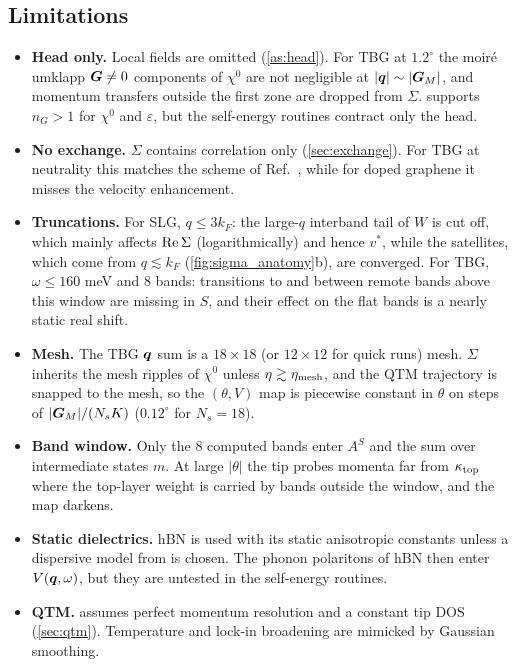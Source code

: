 \subsection{Limitations}

\begin{itemize}[leftmargin=*]
\item \textbf{Head only.} Local fields are omitted (\cref{as:head}). For TBG at $1.2^\circ$ the moir\'e umklapp
$\bm G\neq0$ components of $\chi^0$ are not negligible at $|\bm q|\sim|\bm G_M|$, and momentum transfers outside the first
zone are dropped from $\Sigma$.  supports $n_G>1$ for $\chi^0$ and $\varepsilon$, but the self-energy
routines contract only the head.
\item \textbf{No exchange.} $\Sigma$ contains correlation only (\cref{sec:exchange}). For TBG at neutrality this matches the
scheme of Ref.~\cite{Wei2025}, while for doped graphene it misses the velocity enhancement.
\item \textbf{Truncations.} For SLG, $q\le3k_F$: the large-$q$ interband tail of $W$ is cut off, which mainly affects
$\operatorname{Re}\Sigma$ (logarithmically) and hence $v^*$, while the satellites, which come from $q\lesssim k_F$
(\cref{fig:sigma_anatomy}b), are converged. For TBG, $\omega\le160$ meV and $8$ bands: transitions to and between remote bands
above this window are missing in $S$, and their effect on the flat bands is a nearly static real shift.
\item \textbf{Mesh.} The TBG $\bm q$ sum is a $18\times18$ (or $12\times12$ for quick runs) mesh. $\Sigma$ inherits the
mesh ripples of $\chi^0$ unless $\eta\gtrsim\eta_{\rm mesh}$, and the QTM trajectory is snapped to the mesh,
so the $(\theta,V)$ map is piecewise constant in $\theta$ on steps of $|\bm G_M|/(N_sK)$ ($0.12^\circ$ for $N_s=18$).
\item \textbf{Band window.} Only the 8 computed bands enter $A^S$ and the sum over intermediate states $m$. At large $|\theta|$ the tip probes momenta far from
$\kappa_{\rm top}$ where the top-layer weight is carried by bands outside the window, and the map darkens.
\item \textbf{Static dielectrics.} hBN is used with its static anisotropic constants unless a dispersive model from
 is chosen. The phonon polaritons of hBN then enter $V(\bm q,\omega)$, but they are untested in the
self-energy routines.
\item \textbf{QTM.}  assumes perfect momentum resolution and a constant tip DOS
(\cref{sec:qtm}). Temperature and lock-in broadening are mimicked by Gaussian smoothing.
\end{itemize}
